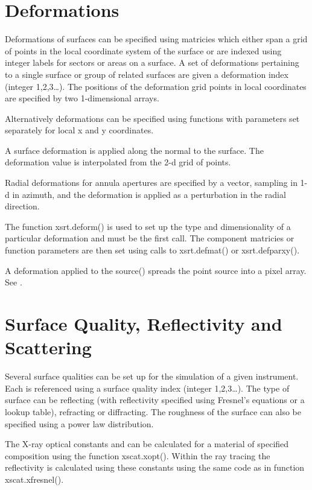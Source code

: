 \documentclass[letterpaper,10pt,english]{sphinxmanual}
\begin{document}
\section{Deformations}
\label{\detokenize{xsrt_deformations:deformations}}\label{\detokenize{xsrt_deformations::doc}}
Deformations of surfaces can be specified using matricies which either span
a grid of points in the local coordinate system of the surface or
are indexed using integer labels for sectors or areas on a surface.
A set of deformations pertaining to a single surface or group of
related surfaces are given a deformation index (integer 1,2,3…).
The positions of the deformation grid points in local coordinates are
specified by two 1-dimensional arrays.

Alternatively deformations can be specified using functions with parameters set
separately for local x and y coordinates.

A surface deformation is applied along the normal to the surface. The
deformation value is interpolated from the 2-d grid of points.

Radial deformations for annula apertures are specified by a vector, sampling
in 1-d in azimuth, and the deformation is applied as a perturbation in the radial
direction.

The function xsrt.deform() is used to set up the type and dimensionality of a
particular deformation and must be the first call. The component matricies or
function parameters are then set using calls to xsrt.defmat() or
xsrt.defparxy().

A deformation applied to the source() spreads the point source into a pixel
array. See .


\section{Surface Quality, Reflectivity and Scattering}
\label{\detokenize{xsrt_surfaces:surface-quality-reflectivity-and-scattering}}\label{\detokenize{xsrt_surfaces::doc}}
Several surface qualities can be set up for the simulation of a given
instrument. Each is referenced using a surface quality index
(integer 1,2,3…). The type of surface can be reflecting (with reflectivity
specified using Fresnel’s equations or a lookup table), refracting
or diffracting. The roughness of the surface can also be specified
using a power law distribution.

The X-ray optical constants  and  can be calculated for
a material of specified composition using the function xscat.xopt().
Within the ray tracing the reflectivity is calculated using these
constants using the same code as in function xscat.xfresnel().
\end{document}
